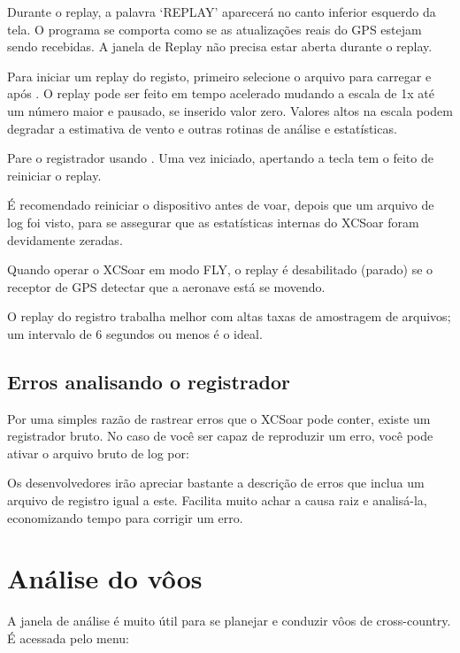 Durante o replay, a palavra ‘REPLAY’ aparecerá no canto inferior esquerdo da tela.  O programa se comporta como se as atualizações reais do GPS estejam sendo recebidas.  A janela de Replay não precisa estar aberta durante o replay.

Para iniciar um replay do registo, primeiro selecione o arquivo para carregar e após 
.  O replay pode ser feito em tempo acelerado mudando a escala de 1x até um número maior e pausado, se inserido valor zero.  Valores altos na escala podem degradar a estimativa de vento e outras rotinas de análise e estatísticas.

Pare o registrador usando   .
Uma vez iniciado, apertando a tecla   tem o feito de reiniciar o replay.

\tip É recomendado reiniciar o dispositivo antes de voar, depois que um arquivo de log foi visto, para se assegurar que as estatísticas internas do XCSoar foram devidamente zeradas.

Quando operar o XCSoar em modo FLY, o replay é desabilitado (parado) se o receptor de GPS detectar que a aeronave está se movendo.

O replay do registro trabalha melhor com altas taxas de amostragem de arquivos; um intervalo de 6 segundos ou menos é o ideal.


\subsection*{Erros analisando o registrador}\label{sec:raw-logger} Por uma simples razão de rastrear erros que o XCSoar pode conter, existe um registrador bruto.  No caso de você ser capaz de reproduzir um erro, você pode ativar o arquivo bruto de log por:
\begin{quote}
\blink{}
\end{quote}
Os desenvolvedores irão apreciar bastante a descrição de erros que inclua um arquivo de registro igual a este.  Facilita muito achar a causa raiz e analisá-la, economizando tempo para corrigir um erro.  

\section{Análise do vôos} \label{sec:analysis-climb}

A janela de análise é muito útil para se planejar e conduzir vôos de cross-country.  É acessada pelo menu: 
\begin{quote}
\blink{}
\end{quote}

